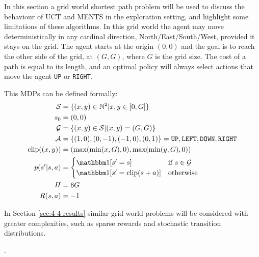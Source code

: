     In this section a grid world shortest path problem will be used to discuss the behaviour of UCT and MENTS in the exploration setting, and highlight some limitations of these algorithms. In this grid world the agent may move deterministically in any cardinal direction, North/East/South/West, provided it stays on the grid. The agent starts at the origin $(0,0)$ and the goal is to reach the other side of the grid, at $(G,G)$, where $G$ is the grid size. The cost of a path is equal to its length, and an optimal policy will always select actions that move the agent \texttt{UP} or \texttt{RIGHT}. 

    This MDPs can be defined formally:
    \begin{align}
        \cl{S} &= \{(x,y)\in\bb{N}^2 | x,y \in [0,G]\} \\
        s_0 &= (0,0) \\
        \cl{G} &= \{(x,y) \in \cl{S} | (x,y) = (G,G)\} \\
        \cl{A} &= \{(1,0),(0,-1),(-1,0),(0,1)\} = {\texttt{UP},\texttt{LEFT},\texttt{DOWN},\texttt{RIGHT}} \\
        \text{clip}((x,y)) &= \left(\max(\min(x,G),0), \max(\min(y,G),0)\right) \\
        p(s'|s,a) &= \begin{cases}
            \one[s'=s] & \text{if } s\in\cl{G} \\
            \one[s'=\text{clip}(s+a)] & \text{otherwise}
        \end{cases} \\
        H &= 6G \\
        R(s,a) &= -1 
    \end{align}

    In Section \ref{sec:4-4-results} similar grid world problems will be considered with greater complexities, such as sparse rewards and stochastic transition distributions.

     \newcommand{\secfouronestate}{s^{(2,2)}}.
    
